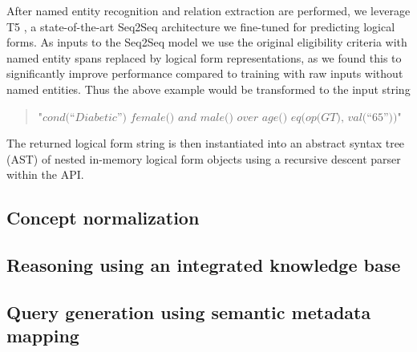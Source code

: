 \documentclass[../main.tex]{subfiles}
\begin{document}
\noindent After named entity recognition and relation extraction are performed, we leverage T5 \cite{raffel2020exploring}, a state-of-the-art Seq2Seq architecture we fine-tuned for predicting logical forms. As inputs to the Seq2Seq model we use the original eligibility criteria with named entity spans replaced by logical form representations, as we found this to significantly improve performance compared to training with raw inputs without named entities. Thus the above example would be transformed to the input string

\begin{quote}
    \centering
    $\textit{"cond(“Diabetic”) female() and male() over age() eq(op(GT), val(“65”))"}$
\end{quote}

\noindent The returned logical form string is then instantiated into an abstract syntax tree (AST) of nested in-memory logical form objects using a recursive descent parser \cite{johnstone1998generalised} within the API.

\subsection*{Concept normalization}

\subsection*{Reasoning using an integrated knowledge base}

\subsection*{Query generation using semantic metadata mapping}
\end{document}

